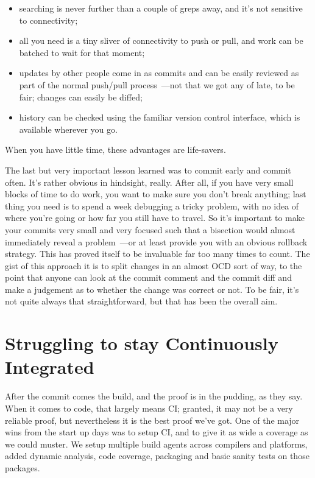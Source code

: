 \documentclass{book}
\begin{document}
\begin{itemize}
\item searching is never further than a couple of greps away, and it's
  not sensitive to connectivity;
\item all you need is a tiny sliver of connectivity to push or pull,
  and work can be batched to wait for that moment;
\item updates by other people come in as commits and can be easily
  reviewed as part of the normal push/pull process~---not that we got
  any of late, to be fair; changes can easily be diffed;
\item history can be checked using the familiar version control
  interface, which is available wherever you go.
\end{itemize}

When you have little time, these advantages are life-savers.

The last but very important lesson learned was to commit early and
commit often. It's rather obvious in hindsight, really. After all, if
you have very small blocks of time to do work, you want to make sure
you don't break anything; last thing you need is to spend a week
debugging a tricky problem, with no idea of where you're going or how
far you still have to travel. So it's important to make your commits
very small and very focused such that a bisection would almost
immediately reveal a problem~---or at least provide you with an obvious
rollback strategy. This has proved itself to be invaluable far too
many times to count. The gist of this approach it is to split changes
in an almost OCD sort of way, to the point that anyone can look at the
commit comment and the commit diff and make a judgement as to whether
the change was correct or not. To be fair, it's not quite always that
straightforward, but that has been the overall aim.

\section{Struggling to stay Continuously Integrated}

After the commit comes the build, and the proof is in the pudding, as
they say. When it comes to code, that largely means CI; granted, it
may not be a very reliable proof, but nevertheless it is the best
proof we've got. One of the major wins from the start up days was to
setup CI, and to give it as wide a coverage as we could muster. We
setup multiple build agents across compilers and platforms, added
dynamic analysis, code coverage, packaging and basic sanity tests on
those packages.
\end{document}
